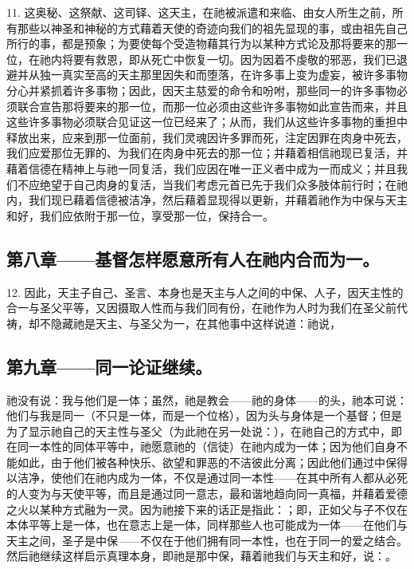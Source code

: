 11. 这奥秘、这祭献、这司铎、这天主，在祂被派遣和来临、由女人所生之前，所有那些以神圣和神秘的方式藉着天使的奇迹向我们的祖先显现的事，或由祖先自己所行的事，都是预象；为要使每个受造物藉其行为以某种方式论及那将要来的那一位，在祂内将要有救恩，即从死亡中恢复一切。因为因着不虔敬的邪恶，我们已退避并从独一真实至高的天主那里因失和而堕落，在许多事上变为虚妄，被许多事物分心并紧抓着许多事物；因此，因天主慈爱的命令和吩咐，那些同一的许多事物必须联合宣告那将要来的那一位，而那一位必须由这些许多事物如此宣告而来，并且这些许多事物必须联合见证这一位已经来了；从而，我们从这些许多事物的重担中释放出来，应来到那一位面前，我们灵魂因许多罪而死，注定因罪在肉身中死去，我们应爱那位无罪的、为我们在肉身中死去的那一位；并藉着相信祂现已复活，并藉着信德在精神上与祂一同复活，我们应因在唯一正义者中成为一而成义；并且我们不应绝望于自己肉身的复活，当我们考虑元首已先于我们众多肢体前行时；在祂内，我们现已藉着信德被洁净，然后藉着显现得以更新，并藉着祂作为中保与天主和好，我们应依附于那一位，享受那一位，保持合一。\par


\subsection{第八章——基督怎样愿意所有人在祂内合而为一。}

12. 因此，天主子自己、圣言、本身也是天主与人之间的中保、人子，因天主性的合一与圣父平等，又因摄取人性而与我们同有份，在祂作为人时为我们在圣父前代祷，却不隐藏祂是天主、与圣父为一，在其他事中这样说道：祂说，\par


\subsection{第九章——同一论证继续。}

祂没有说：我与他们是一体；虽然，祂是教会——祂的身体——的头，祂本可说：他们与我是同一（不只是一体，而是一个位格），因为头与身体是一个基督；但是为了显示祂自己的天主性与圣父（为此祂在另一处说：），在祂自己的方式中，即在同一本性的同体平等中，祂愿意祂的（信徒）在祂内成为一体；因为他们自身不能如此，由于他们被各种快乐、欲望和罪恶的不洁彼此分离；因此他们通过中保得以洁净，使他们在祂内成为一体，不仅是通过同一本性——在其中所有人都从必死的人变为与天使平等，而且是通过同一意志，最和谐地趋向同一真福，并藉着爱德之火以某种方式融为一灵。因为祂接下来的话正是指此：；即，正如父与子不仅在本体平等上是一体，也在意志上是一体，同样那些人也可能成为一体——在他们与天主之间，圣子是中保——不仅在于他们拥有同一本性，也在于同一的爱之结合。然后祂继续这样启示真理本身，即祂是那中保，藉着祂我们与天主和好，说：。\par

